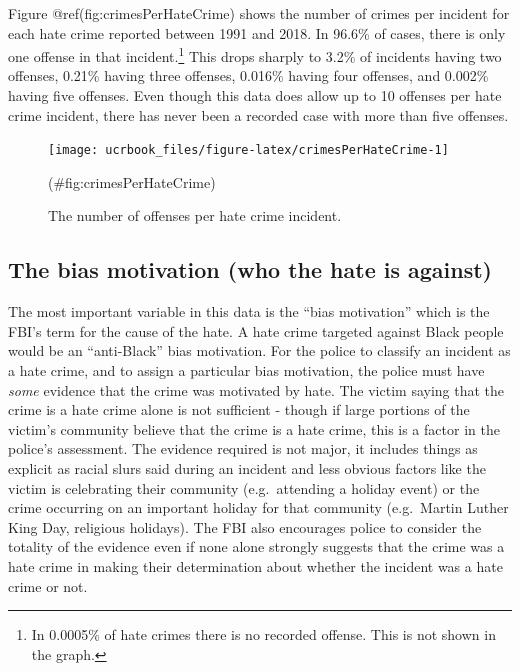 \documentclass[
  12pt,
  openany]{book}
\begin{document}
Figure @ref(fig:crimesPerHateCrime) shows the number of crimes per incident for each hate crime reported between 1991 and 2018. In 96.6\% of cases, there is only one offense in that incident.\footnote{In 0.0005\% of hate crimes there is no recorded offense. This is not shown in the graph.} This drops sharply to 3.2\% of incidents having two offenses, 0.21\% having three offenses, 0.016\% having four offenses, and 0.002\% having five offenses. Even though this data does allow up to 10 offenses per hate crime incident, there has never been a recorded case with more than five offenses.

\begin{figure}

{\centering \texttt{[image: ucrbook\_files/figure-latex/crimesPerHateCrime-1]} 

}

\caption{The number of offenses per hate crime incident.}(\#fig:crimesPerHateCrime)
\end{figure}

\hypertarget{the-bias-motivation-who-the-hate-is-against}{%
\subsection{The bias motivation (who the hate is against)}\label{the-bias-motivation-who-the-hate-is-against}}

The most important variable in this data is the ``bias motivation'' which is the FBI's term for the cause of the hate. A hate crime targeted against Black people would be an ``anti-Black'' bias motivation. For the police to classify an incident as a hate crime, and to assign a particular bias motivation, the police must have \emph{some} evidence that the crime was motivated by hate. The victim saying that the crime is a hate crime alone is not sufficient - though if large portions of the victim's community believe that the crime is a hate crime, this is a factor in the police's assessment. The evidence required is not major, it includes things as explicit as racial slurs said during an incident and less obvious factors like the victim is celebrating their community (e.g.~attending a holiday event) or the crime occurring on an important holiday for that community (e.g.~Martin Luther King Day, religious holidays). The FBI also encourages police to consider the totality of the evidence even if none alone strongly suggests that the crime was a hate crime in making their determination about whether the incident was a hate crime or not.
\end{document}
